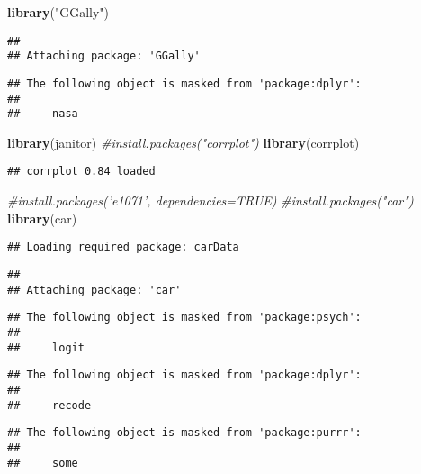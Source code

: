 \documentclass[]{article}
\newenvironment{Shaded}{\begin{snugshade}}{\end{snugshade}}
\newcommand{\KeywordTok}[1]{\textcolor[rgb]{0.13,0.29,0.53}{\textbf{#1}}}
\newcommand{\StringTok}[1]{\textcolor[rgb]{0.31,0.60,0.02}{#1}}
\newcommand{\CommentTok}[1]{\textcolor[rgb]{0.56,0.35,0.01}{\textit{#1}}}
\newcommand{\NormalTok}[1]{#1}
\begin{document}
\begin{Shaded}
\begin{Highlighting}[]
\KeywordTok{library}\NormalTok{(}\StringTok{"GGally"}\NormalTok{)}
\end{Highlighting}
\end{Shaded}

\begin{verbatim}
## 
## Attaching package: 'GGally'
\end{verbatim}

\begin{verbatim}
## The following object is masked from 'package:dplyr':
## 
##     nasa
\end{verbatim}

\begin{Shaded}
\begin{Highlighting}[]
\KeywordTok{library}\NormalTok{(janitor)}
\CommentTok{#install.packages("corrplot")}
\KeywordTok{library}\NormalTok{(corrplot)}
\end{Highlighting}
\end{Shaded}

\begin{verbatim}
## corrplot 0.84 loaded
\end{verbatim}

\begin{Shaded}
\begin{Highlighting}[]
\CommentTok{#install.packages('e1071', dependencies=TRUE)}
\CommentTok{#install.packages("car")}
\KeywordTok{library}\NormalTok{(car)}
\end{Highlighting}
\end{Shaded}

\begin{verbatim}
## Loading required package: carData
\end{verbatim}

\begin{verbatim}
## 
## Attaching package: 'car'
\end{verbatim}

\begin{verbatim}
## The following object is masked from 'package:psych':
## 
##     logit
\end{verbatim}

\begin{verbatim}
## The following object is masked from 'package:dplyr':
## 
##     recode
\end{verbatim}

\begin{verbatim}
## The following object is masked from 'package:purrr':
## 
##     some
\end{verbatim}
\end{document}
